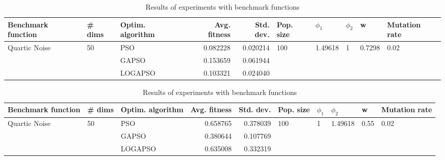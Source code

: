\documentclass{article}
\begin{document}
\begin{table}
\centering
\caption{Results of experiments with benchmark functions}
\begin{tabular}{lllrrlllll}
\toprule
            Benchmark function &             \# dims & Optim. algorithm &  Avg. fitness &  Std. dev. &            Pop. size &               $\phi_{1}$ &         $\phi_{2}$ &                       w &         Mutation rate \\
\midrule
\multirow{3}{*}{Quartic Noise} & \multirow{3}{*}{50} &              PSO &      0.082228 &   0.020214 & \multirow{3}{*}{100} & \multirow{3}{*}{1.49618} & \multirow{3}{*}{1} & \multirow{3}{*}{0.7298} & \multirow{3}{*}{0.02} \\
                               &                     &            GAPSO &      0.153659 &   0.061944 &                      &                          &                    &                         &                       \\
                               &                     &          LOGAPSO &      0.103321 &   0.024040 &                      &                          &                    &                         &                       \\
\bottomrule
\end{tabular}
\end{table}
\begin{table}
\centering
\caption{Results of experiments with benchmark functions}
\begin{tabular}{lllrrlllll}
\toprule
            Benchmark function &             \# dims & Optim. algorithm &  Avg. fitness &  Std. dev. &            Pop. size &         $\phi_{1}$ &               $\phi_{2}$ &                     w &         Mutation rate \\
\midrule
\multirow{3}{*}{Quartic Noise} & \multirow{3}{*}{50} &              PSO &      0.658765 &   0.378039 & \multirow{3}{*}{100} & \multirow{3}{*}{1} & \multirow{3}{*}{1.49618} & \multirow{3}{*}{0.55} & \multirow{3}{*}{0.02} \\
                               &                     &            GAPSO &      0.380644 &   0.107769 &                      &                    &                          &                       &                       \\
                               &                     &          LOGAPSO &      0.635008 &   0.332319 &                      &                    &                          &                       &                       \\
\bottomrule
\end{tabular}
\end{table}
\end{document}
